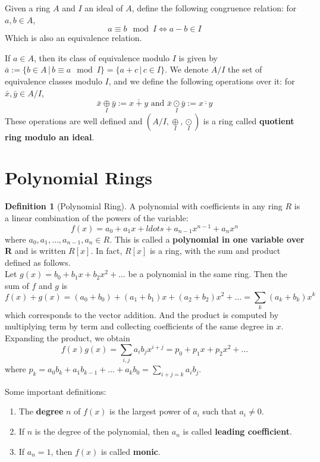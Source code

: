 \documentclass[12pt,a4paper]{article}
\theoremstyle{definition}
\newtheorem{definition}{Definition}[section]
\begin{document}
Given a ring $A$ and $I$ an ideal of $A$, define the following congruence relation: for $a, b \in A$,
\[a \equiv b \mod I \iff a- b \in I  \]
Which is also an equivalence relation.

If $a \in A$, then its class of equivalence modulo $I$ is given by \(\bar{a} := \{ b \in A \, | \, b \equiv a \mod I \} = \{ a + c \, | \, c \in I \}\). We denote $A/I$ the set of equivalence classes modulo $I$, and we define the following operations over it: for $\bar{x}, \bar{y} \in A/I$, 
\[
\bar{x} \underset{I}{\oplus} \bar{y} := \overline{x+y} \text{ and } \bar{x} \underset{I}{\odot} \bar{y} := \overline{x\cdot y}
\]
These operations are well defined and $(A/I, \underset{I}{\oplus},  \underset{I}{\odot})$ is a ring called \textbf{quotient ring modulo an ideal}.

\section{Polynomial Rings}\label{polynomial-rings}

\begin{definition}[Polynomial Ring]
A polynomial with coefficients in any ring $R$ is a linear combination of the powers of the variable:
\[
f(x) = a_0 + a_1 x + ldots + a_{n-1} x^{n-1} + a_n x^n
\]
where $a_0, a_1, \ldots, a_{n-1}, a_n \in R$. This is called a \textbf{polynomial in one variable over R} and is written $R[x]$. In fact, $R[x]$ is a ring, with the sum and product defined as follows. \\

Let $g(x) = b_0 + b_1 x + b_2 x^2 + \ldots$ be a polynomial in the same ring. Then the sum of $f$ and $g$ is 
\[
f(x) +  g(x) = (a_0 + b_0) + (a_1 + b_1)x + (a_2 + b_2)x^2 + \ldots = \sum_k (a_k + b_k)x^k
\]
which corresponds to the vector addition. And the product is computed by multiplying term by term and collecting coefficients of the same degree in $x$. Expanding the product, we obtain
\[
f(x)g(x) = \sum_{i,j} a_i b_j x^{i+j} = p_0 + p_1 x + p_2 x^2 + \ldots
\]
where $p_k = a_0 b_k + a_1 b_{k-1} + \ldots + a_k b_0 = \sum_{i+j=k} a_i b_j$.
\end{definition}

Some important definitions:
\begin{enumerate}
\item The \textbf{degree} $n$ of $f(x)$ is the largest power of $a_i$ such that $a_i \neq 0$.  
\item If $n$ is the degree of the polynomial, then $a_n$ is called \textbf{leading coefficient}. 
\item If $a_n = 1$, then $f(x)$ is called \textbf{monic}.
\end{enumerate}
\end{document}
